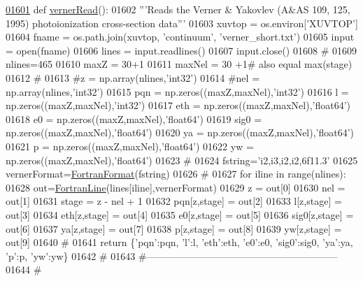 \begin{DoxyCode}
\hypertarget{namespacepyneb_1_1utils_1_1__chianti__tools_l01601}{}\hyperlink{namespacepyneb_1_1utils_1_1__chianti__tools_addacad8fe4cf3dff7f457b8b4a58054f}{01601} \textcolor{keyword}{def }\hyperlink{namespacepyneb_1_1utils_1_1__chianti__tools_addacad8fe4cf3dff7f457b8b4a58054f}{vernerRead}():
01602     \textcolor{stringliteral}{'''Reads the Verner & Yakovlev (A&AS 109, 125, 1995) photoionization cross-section data'''}
01603     xuvtop = os.environ[\textcolor{stringliteral}{'XUVTOP'}]
01604     fname = os.path.join(xuvtop, \textcolor{stringliteral}{'continuum'}, \textcolor{stringliteral}{'verner\_short.txt'})
01605     input = open(fname)
01606     lines = input.readlines()
01607     input.close()
01608     \textcolor{comment}{#}
01609     nlines=465
01610     maxZ = 30+1
01611     maxNel = 30 +1\textcolor{comment}{# also equal max(stage)}
01612     \textcolor{comment}{#}
01613     \textcolor{comment}{#z = np.array(nlines,'int32')}
01614     \textcolor{comment}{#nel = np.array(nlines,'int32')}
01615     pqn = np.zeros((maxZ,maxNel),\textcolor{stringliteral}{'int32'})
01616     l = np.zeros((maxZ,maxNel),\textcolor{stringliteral}{'int32'})
01617     eth = np.zeros((maxZ,maxNel),\textcolor{stringliteral}{'float64'})
01618     e0 = np.zeros((maxZ,maxNel),\textcolor{stringliteral}{'float64'})
01619     sig0 = np.zeros((maxZ,maxNel),\textcolor{stringliteral}{'float64'})
01620     ya = np.zeros((maxZ,maxNel),\textcolor{stringliteral}{'float64'})
01621     p = np.zeros((maxZ,maxNel),\textcolor{stringliteral}{'float64'})
01622     yw = np.zeros((maxZ,maxNel),\textcolor{stringliteral}{'float64'})
01623     \textcolor{comment}{#}
01624     fstring=\textcolor{stringliteral}{'i2,i3,i2,i2,6f11.3'}
01625     vernerFormat=\hyperlink{classpyneb_1_1utils_1_1_fortran_format_1_1_fortran_format}{FortranFormat}(fstring)
01626     \textcolor{comment}{#}
01627     \textcolor{keywordflow}{for} iline \textcolor{keywordflow}{in} range(nlines):
01628         out=\hyperlink{classpyneb_1_1utils_1_1_fortran_format_1_1_fortran_line}{FortranLine}(lines[iline],vernerFormat)
01629         z = out[0]
01630         nel = out[1]
01631         stage = z - nel + 1
01632         pqn[z,stage] = out[2]
01633         l[z,stage] = out[3]
01634         eth[z,stage] = out[4]
01635         e0[z,stage] = out[5]
01636         sig0[z,stage] = out[6]
01637         ya[z,stage] = out[7]
01638         p[z,stage] = out[8]
01639         yw[z,stage] = out[9]
01640     \textcolor{comment}{#}
01641     \textcolor{keywordflow}{return} \{\textcolor{stringliteral}{'pqn'}:pqn, \textcolor{stringliteral}{'l'}:l, \textcolor{stringliteral}{'eth'}:eth, \textcolor{stringliteral}{'e0'}:e0, \textcolor{stringliteral}{'sig0'}:sig0, \textcolor{stringliteral}{'ya'}:ya, \textcolor{stringliteral}{'p'}:p, \textcolor{stringliteral}{'yw'}:yw\}
01642     \textcolor{comment}{#}
01643     \textcolor{comment}{#-----------------------------------------------------------}
01644     \textcolor{comment}{#}
\end{DoxyCode}
